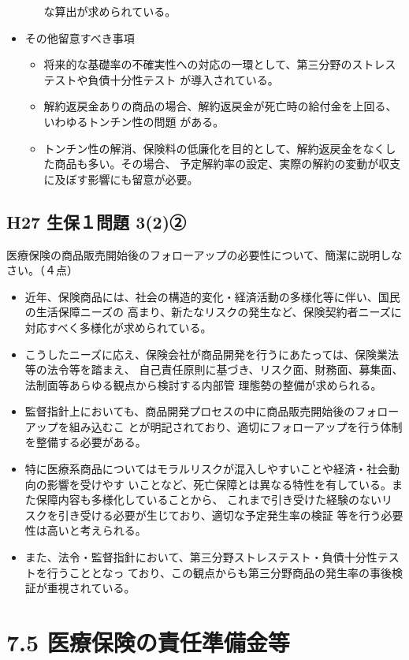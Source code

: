 \documentclass[report,gutter=10mm,fore-edge=10mm,uplatex,dvipdfmx]{jlreq}
\begin{document}
\begin{itemize}
\begin{itemize}
な算出が求められている。
\end{itemize}
 \item その他留意すべき事項
\begin{itemize} 
 \item 将来的な基礎率の不確実性への対応の一環として、第三分野のストレステストや負債十分性テスト が導入されている。
 \item  解約返戻金ありの商品の場合、解約返戻金が死亡時の給付金を上回る、いわゆるトンチン性の問題 がある。
 \item  トンチン性の解消、保険料の低廉化を目的として、解約返戻金をなくした商品も多い。その場合、
 予定解約率の設定、実際の解約の変動が収支に及ぼす影響にも留意が必要。
\end{itemize}
\end{itemize}

\subsection{H27 生保１問題 3(2)②}
医療保険の商品販売開始後のフォローアップの必要性について、簡潔に説明しなさい。（４点）

\begin{itemize}
 \item  近年、保険商品には、社会の構造的変化・経済活動の多様化等に伴い、国民の生活保障ニーズの
		     高まり、新たなリスクの発生など、保険契約者ニーズに対応すべく多様化が求められている。
 \item  こうしたニーズに応え、保険会社が商品開発を行うにあたっては、保険業法等の法令等を踏まえ、
  自己責任原則に基づき、リスク面、財務面、募集面、法制面等あらゆる観点から検討する内部管
  理態勢の整備が求められる。
\item 監督指針上においても、商品開発プロセスの中に商品販売開始後のフォローアップを組み込むこ
  とが明記されており、適切にフォローアップを行う体制を整備する必要がある。
\item 特に医療系商品についてはモラルリスクが混入しやすいことや経済・社会動向の影響を受けやす
  いことなど、死亡保障とは異なる特性を有している。また保障内容も多様化していることから、
  これまで引き受けた経験のないリスクを引き受ける必要が生じており、適切な予定発生率の検証
  等を行う必要性は高いと考えられる。
\item また、法令・監督指針において、第三分野ストレステスト・負債十分性テストを行うこととなっ
 ており、この観点からも第三分野商品の発生率の事後検証が重視されている。
\end{itemize}

\section{7.5 医療保険の責任準備金等}
\end{document}
